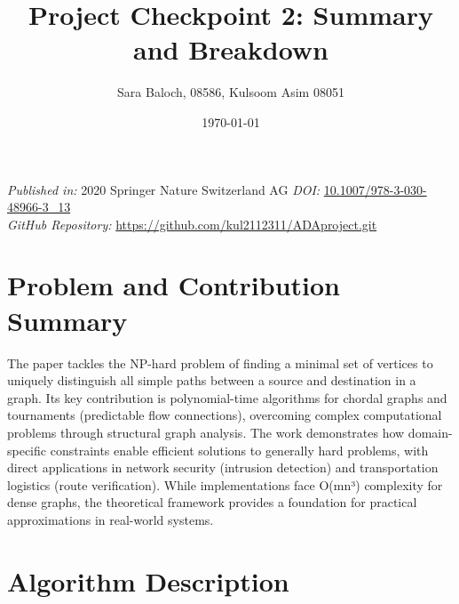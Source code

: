 \documentclass{article}
\title{Project Checkpoint 2: Summary and Breakdown}
\author{Sara Baloch, 08586, Kulsoom Asim 08051}
\date{\today}
\begin{document}
\maketitle
\noindent \textit{Published in:} 2020 Springer Nature Switzerland AG \newline
\textit{DOI:} \href{https://doi.org/10.1007/978-3-030-48966-3_13}{10.1007/978-3-030-48966-3\_13} \\
\textit{GitHub Repository:} \href{https://github.com/kul2112311/ADAproject.git}{https://github.com/kul2112311/ADAproject.git}

\section{Problem and Contribution Summary}

The paper tackles the NP-hard problem of finding a minimal set of vertices to uniquely distinguish all simple paths between a source and destination in a graph. Its key contribution is polynomial-time algorithms for chordal graphs and tournaments (predictable flow connections), overcoming complex computational problems through structural graph analysis. The work demonstrates how domain-specific constraints enable efficient solutions to generally hard problems, with direct applications in network security (intrusion detection) and transportation logistics (route verification). While implementations face O(mn³) complexity for dense graphs, the theoretical framework provides a foundation for practical approximations in real-world systems.



\section{Algorithm Description}
\end{document}
